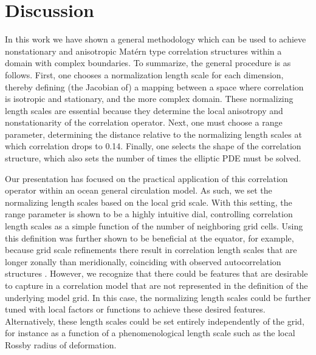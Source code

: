 \section{Discussion}
\label{sec:matern_discussion}

In this work we have shown a general methodology which can be used to achieve
nonstationary and anisotropic Mat\'ern type correlation structures within a
domain with complex boundaries.
To summarize, the general procedure is as follows.
First, one chooses a normalization length scale for each dimension, thereby
defining (the Jacobian of) a mapping between a space where correlation is
isotropic and stationary, and the more complex domain.
These normalizing length scales are essential because they determine the local
anisotropy and nonstationarity of the correlation operator.
Next, one must choose a range parameter, determining the distance relative to
the normalizing length scales at which correlation drops to 0.14.
Finally, one selects the shape of the correlation structure, which also sets the
number of times the elliptic PDE must be solved.

Our presentation has focused on the practical application of this
correlation operator within an ocean general circulation model.
As such, we set the normalizing length scales based on the local grid
scale.
With this setting, the range parameter is shown to be a highly intuitive dial,
controlling correlation length scales as a simple function of the number of
neighboring grid cells.
Using this definition was further shown to be beneficial at the equator, for
example, because grid scale refinements there result in correlation length
scales that are longer zonally than meridionally, coinciding with observed
autocorrelation structures
\citep{meyers_space_1991}.
However, we recognize that there could be features that are desirable to capture
in a correlation model that are not represented in the definition of the
underlying model grid.
In this case, the normalizing length scales could be further tuned with
local factors or functions to achieve these desired features.
Alternatively, these length scales could be set entirely independently of
the grid, for instance as a function of a phenomenological length scale such as
the local Rossby radius of deformation.

